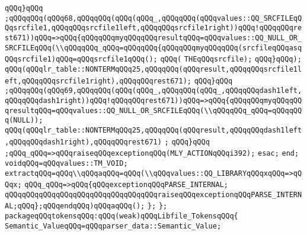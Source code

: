 \verb|qQQq}qQQq|\newline
\verb|;qQQqqQQq(qQQq68,qQQqqQQq(qQQq(qQQq_,qQQqqQQq(qQQqvalues::QQ_SRCFILEqQQqsrcfile1,qQQqqQQqsrcfile1left,qQQqqQQqsrcfile1right))qQQq!qQQqqQQqrest671))qQQq=>qQQq{qQQqqQQqmyqQQqqQQqresultqQQq=qQQqvalues::QQ_NULL_OR_SRCFILEqQQq(\\qQQqqQQq_qQQq=qQQqqQQq{qQQqqQQqmyqQQqqQQq(srcfileqQQqasqQQqsrcfile1)qQQq=qQQqsrcfile1qQQq();|\newline
\verb|qQQq(|\newline
\verb|THEqQQqsrcfile);|\newline
\verb|qQQq}qQQq);|\newline
\verb|qQQq(qQQqlr_table::NONTERMqQQq25,qQQqqQQq(qQQqresult,qQQqqQQqsrcfile1left,qQQqqQQqsrcfile1right),qQQqqQQqrest671);|\newline
\verb|qQQq}qQQq|\newline
\verb|;qQQqqQQq(qQQq69,qQQqqQQq(qQQq(qQQq_,qQQqqQQq(qQQq_,qQQqqQQqdash1left,qQQqqQQqdash1right))qQQq!qQQqqQQqrest671))qQQq=>qQQq{qQQqqQQqmyqQQqqQQqresultqQQq=qQQqvalues::QQ_NULL_OR_SRCFILEqQQq(\\qQQqqQQq_qQQq=qQQqqQQq(NULL));|\newline
\verb|qQQq(qQQqlr_table::NONTERMqQQq25,qQQqqQQq(qQQqresult,qQQqqQQqdash1left,qQQqqQQqdash1right),qQQqqQQqrest671)|\newline
\verb|;|\newline
\verb|qQQq}qQQq|\newline
\verb|;qQQq_qQQq=>qQQqraiseqQQqexceptionqQQq(MLY_ACTIONqQQqi392);|\newline
\verb|esac;|\newline
\verb|end;|\newline
\verb|voidqQQq=qQQqvalues::TM_VOID;|\newline
\verb|extractqQQq=qQQq\\qQQqaqQQq=qQQq(\\qQQqvalues::QQ_LIBRARYqQQqxqQQq=>qQQqx;|\newline
\verb|qQQq_qQQq=>qQQq{qQQqexceptionqQQqPARSE_INTERNAL;|\newline
\verb|qQQqqQQqqQQqqQQqqQQqqQQqqQQqqQQqqQQqraiseqQQqexceptionqQQqPARSE_INTERNAL;qQQq};qQQqendqQQq)qQQqaqQQq();|\newline
\verb|};|\newline
\verb|};|\newline
\verb|packageqQQqtokensqQQq:qQQq(weak)qQQqLibfile_TokensqQQq{|\newline
\verb|Semantic_ValueqQQq=qQQqparser_data::Semantic_Value;|\newline
